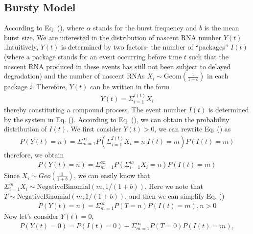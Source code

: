 \documentclass[a4paper,10pt]{article}
\begin{document}
\subsection{Bursty Model}
According to Eq. (), where $\alpha$ stands for the burst frequency and $b$ is the mean burst size. We are interested in the distribution of nascent RNA number $Y(t)$.Intuitively, $Y(t)$ is determined by two factors-
the number of “packages” $I(t)$ (where a package stands for an event occurring before time $t$ such that the
nascent RNA produced in these events has still not been subject to delayed degradation) and the number
of nascent RNAs $X_i\sim\text{Geom}(\frac{1}{1+b})$ in each package $i$. Therefore, $Y(t)$ can be written in the form
\begin{equation}
	\begin{aligned}\label{Y(t)}
		Y(t)=\Sigma_{i=1}^{I(t)} X_i
	\end{aligned}
\end{equation}
thereby constituting a compound process. The event number $I(t)$ is determined by the system in Eq. (). According to Eq. (), we can obtain the probability distribution of $I(t)$. We first consider $Y(t)>0$, we can rewrite Eq. () as 
\begin{equation}
	\begin{aligned}
	P(Y(t)=n)=\Sigma_{m=1}^\infty P(\Sigma_{i=1}^{I(t)}X_i=n|I(t)=m)P(I(t)=m)
	\end{aligned}
\end{equation}
therefore, we obtain
\begin{equation}\label{Y(t)2}
	\begin{aligned}
	P(Y(t)=n)=\Sigma_{m=1}^\infty P(\Sigma_{i=1}^m X_i=n)P(I(t)=m) 
	\end{aligned}
\end{equation}
Since $X_i\sim Geo(\frac{1}{1+b})$, we can easily know that $\Sigma_{i=1}^m X_i\sim \text{NegativeBinomial}(m,1/(1+b))$. Here we note that $T\sim \text{NegativeBinomial}(m,1/(1+b))$, and then we can simplify Eq. ()
\begin{equation}
	\begin{aligned}\label{Y_n}
		P(Y(t)=n)=\Sigma_{m=1}^\infty P(T=n)P(I(t)=m),n>0
	\end{aligned}
\end{equation}
Now let's consider $Y(t)=0$,
\begin{equation}
	\begin{aligned}\label{Y_0}
	P(Y(t)=0)=P(I(t)=0)+\Sigma_{m=1}^\infty P(T=0)P(I(t)=m),
	\end{aligned}
\end{equation}
\end{document}
